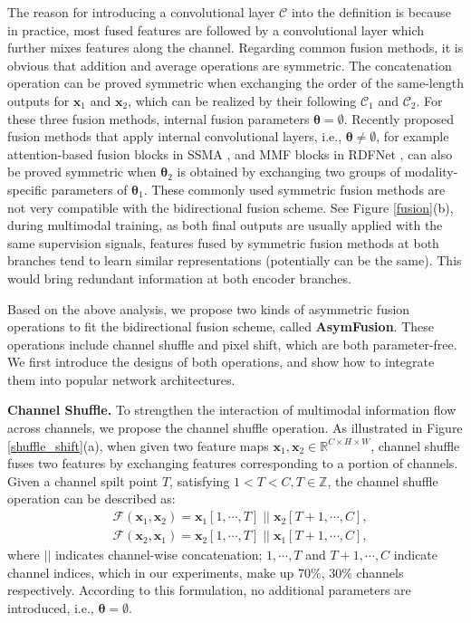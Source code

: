 \documentclass[sigconf]{acmart}
\begin{document}
The reason for introducing a convolutional layer $\mathcal{C}$ into the definition is because in practice, most fused features are followed by a convolutional layer which further mixes features along the channel. Regarding common fusion methods, it is obvious that addition and average operations are symmetric. The concatenation operation can be proved symmetric when exchanging the order of the same-length outputs for $\bm{x}_1$ and $\bm{x}_2$, which can be realized by their following $\mathcal{C}_1$ and $\mathcal{C}_2$. For these three fusion methods, internal fusion parameters $\bm{\theta}=\emptyset$. Recently proposed fusion methods that apply internal convolutional layers, i.e., $\bm{\theta}\ne\emptyset$, for example attention-based fusion blocks in SSMA \cite{DBLP:journals/ijcv/RussakovskyDSKS15}, and MMF blocks in RDFNet \cite{DBLP:conf/iccv/LeePH17}, can also be proved symmetric when $\bm{\theta}_2$ is obtained by exchanging two groups of modality-specific parameters of $\bm{\theta}_1$. These commonly used symmetric fusion methods are not very compatible with the bidirectional fusion scheme. See Figure \ref{fusion}(b), during multimodal training, as both final outputs are usually applied with the same supervision signals, features fused by symmetric fusion methods at both branches tend to learn similar representations (potentially can be the same). This would bring redundant information at both encoder branches.

Based on the above analysis, we propose two kinds of asymmetric fusion operations to fit the bidirectional fusion scheme, called \textbf{AsymFusion}. These operations include channel shuffle and pixel shift, which are both parameter-free. We first introduce the designs of both operations, and show how to integrate them into popular network architectures. 

\textbf{Channel Shuffle.} To strengthen the interaction of multimodal information flow across channels, we propose the channel shuffle operation. As illustrated in Figure \ref{shuffle_shift}(a), when given two feature maps $\bm{x}_1,\bm{x}_2\in\mathbb{R}^{C\times H\times W}$, channel shuffle fuses two features by exchanging features corresponding to a portion of channels. Given a channel spilt point $T$, satisfying $1<T<C,T\in\mathbb{Z}$, the channel shuffle operation can be described as:
\begin{equation}
\begin{split}
&\mathcal{F}(\bm{x}_1, \bm{x}_2)=\bm{x}_1[1,\cdots,T]\;||\;\bm{x}_2[T+1,\cdots,C],\\
&\mathcal{F}(\bm{x}_2, \bm{x}_1)=\bm{x}_2[1,\cdots,T]\;||\;\bm{x}_1[T+1,\cdots,C],
\end{split}
\end{equation}
where $||$ indicates channel-wise concatenation; $1,\cdots,T$ and $T+1,\cdots,C$ indicate channel indices, which in our experiments, make up 70\%, 30\% channels respectively. According to this formulation, no additional parameters are introduced, i.e., $\bm{\theta}=\emptyset$.
\end{document}
